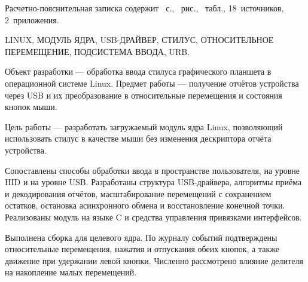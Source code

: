 
Расчетно-пояснительная записка содержит \pageref{LastPage}~с., \totalfigures~рис., \totaltables~табл., 18~источников, 2~приложения.

LINUX, МОДУЛЬ ЯДРА, USB-ДРАЙВЕР, СТИЛУС, ОТНОСИТЕЛЬНОЕ ПЕРЕМЕЩЕНИЕ, ПОДСИСТЕМА ВВОДА, URB.

Объект разработки --- обработка ввода стилуса графического планшета в операционной системе Linux. Предмет работы --- получение отчётов устройства через USB и их преобразование в относительные перемещения и состояния кнопок мыши.

Цель работы --- разработать загружаемый модуль ядра Linux, позволяющий использовать стилус в качестве мыши без изменения дескриптора отчёта устройства.

Сопоставлены способы обработки ввода в пространстве пользователя, на уровне HID и на уровне USB. Разработаны структура USB-драйвера, алгоритмы приёма и декодирования отчётов, масштабирование перемещений с сохранением остатков, остановка асинхронного обмена и восстановление конечной точки. Реализованы модуль на языке C и средства управления привязками интерфейсов.

Выполнена сборка для целевого ядра. По журналу событий подтверждены относительные перемещения, нажатия и отпускания обеих кнопок, а также движение при удержании левой кнопки. Численно рассмотрено влияние делителя на накопление малых перемещений.
\clearpage
